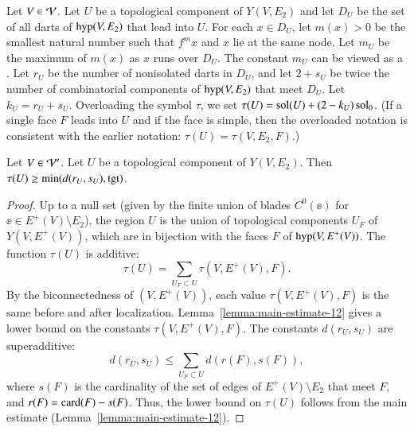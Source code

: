 \documentclass{llncs}
\def\op#1{{\hbox{#1}}}
\begin{document}
\begin{definition}[$D_U$,~$m_U$,~$r_U$,~$s_U$,~$k_U$,~$\tau(U)$]
  Let $V\in {\mathcal V}$.  Let $U$ be a topological component of
  $Y(V,E_{2})$ and let $D_U$ be the set of all darts of $\op{hyp}(V,E_{2})$
 that lead into
  $U$.   For each
  $x\in D_U$, let $m(x) >0$ be the smallest natural number such that
  $f^{m} x$ and $x$ lie at the same node.  Let $m_U$ be the maximum of
  $m(x)$  as $x$ runs over $D_U$.  The constant $m_U$ can be viewed as
  a .  
Let $r_U$ be the number of nonisolated darts in $D_U$, and let $2+s_U$ be twice the
  number of combinatorial components of $\op{hyp}(V,E_{2})$ that
  meet $D_U$.  Let $k_U=r_U+s_U$.  Overloading the symbol $\tau$, we
  set $\tau(U) = \operatorname{sol}(U) +  (2-k_U)\operatorname{sol}_0$.   (If a single  face $F$ leads into
  $U$ and if the face is simple, then the overloaded notation is consistent
with the earlier notation: $\tau(U) = \tau(V,E_{2},F)$.)
%
\end{definition}

\begin{lemma}\label{lemma:tauU'}
  Let $V\in {\mathcal V}'$.
Let $U$ be a topological component of
  $Y(V,E_{2})$.   Then $\tau(U)\ge \min(d(r_U,s_U),\op{tgt})$.
\end{lemma}

\begin{proof}
Up to a null set (given by the finite union of blades $C^0(\ee)$ for
$\ee\in E^+(V)\setminus E_{2}$), the region $U$ is the union of topological
components $U_F$ of $Y(V,E^+(V))$, which are in bijection with the faces
$F$ of $\op{hyp}(V,E^+(V))$.  The function $\tau(U)$ is additive:
\begin{equation}\label{eqn:tau-additive}
\tau(U) = \sum_{U_F\subset U} \tau(V,E^+(V),F).
\end{equation}
By the biconnectedness of $(V,E^+(V))$, each value $\tau(V,E^+(V),F)$ is the
same before and after localization.
Lemma~\ref{lemma:main-estimate-12} gives a lower bound on the
constants $\tau(V,E^+(V),F)$.  The constants $d(r_U,s_U)$ are superadditive:
\[
d(r_U,s_U) \le \sum_{U_F\subset U} d(r(F),s(F)),
\]
where $s(F)$ is the cardinality of the set of edges of $E^+(V)\setminus
E_{2}$ that meet $F$, and $r(F) = \card(F)-s(F)$.  Thus, the 
lower bound on $\tau(U)$ follows from the main estimate
(Lemma~\ref{lemma:main-estimate-12}).
\end{proof}
\end{document}
